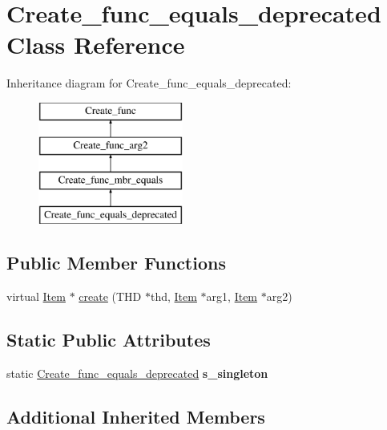 \hypertarget{classCreate__func__equals__deprecated}{}\section{Create\+\_\+func\+\_\+equals\+\_\+deprecated Class Reference}
\label{classCreate__func__equals__deprecated}
Inheritance diagram for Create\+\_\+func\+\_\+equals\+\_\+deprecated\+:\begin{figure}[H]
\begin{center}
\leavevmode
\includegraphics[height=4.000000cm]{classCreate__func__equals__deprecated}
\end{center}
\end{figure}
\subsection*{Public Member Functions}
\begin{DoxyCompactItemize}
\item 
virtual \mbox{\hyperlink{classItem}{Item}} $\ast$ \mbox{\hyperlink{classCreate__func__equals__deprecated_a3919da2865dbdfc683ab0e8b17b532b8}{create}} (T\+HD $\ast$thd, \mbox{\hyperlink{classItem}{Item}} $\ast$arg1, \mbox{\hyperlink{classItem}{Item}} $\ast$arg2)
\end{DoxyCompactItemize}
\subsection*{Static Public Attributes}
\begin{DoxyCompactItemize}
\item 
\mbox{\label{classCreate__func__equals__deprecated_acc77b3845163798280ddd485244c5808}} 
static \mbox{\hyperlink{classCreate__func__equals__deprecated}{Create\+\_\+func\+\_\+equals\+\_\+deprecated}} {\bfseries s\+\_\+singleton}
\end{DoxyCompactItemize}
\subsection*{Additional Inherited Members}


